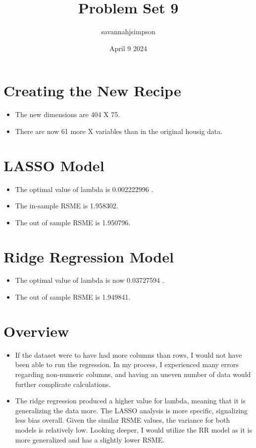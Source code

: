 \documentclass{article}
\title{Problem Set 9}
\author{savannahjsimpson }
\date{April 9 2024}
\begin{document}
\maketitle

\section{Creating the New Recipe }
\begin{itemize}
\item The new dimensions are 404 X 75. 
\item There are now 61 more X variables than in the original housig data. 
\end{itemize}

\section{LASSO Model}
\begin{itemize}
\item The optimal value of lambda is 0.002222996 . 
\item The in-sample RSME is 1.958302. 
\item The out of sample RSME is 1.950796. 
\end{itemize}

\section{Ridge Regression Model}
\begin{itemize}
\item The optimal value of lambda is now 0.03727594  . 
\item The out of sample RSME is 1.949841. 
\end{itemize}

\section{Overview}
\begin{itemize}
\item If the dataset were to have had more columns than rows, I would not have been able to run the regression. In my process, I experienced many errors regarding non-numeric columns, and having an uneven number of data would further complicate calculations. 
\item The ridge regression produced a higher value for lambda, meaning that it is generalizing the data more. The LASSO analysis is more specific, signalizing less bias overall. Given the similar RSME values, the variance for both models is relatively low. Looking deeper, I would utilize the RR model as it is more generalized and has a slightly lower RSME. 
\end{itemize}
\end{document}
